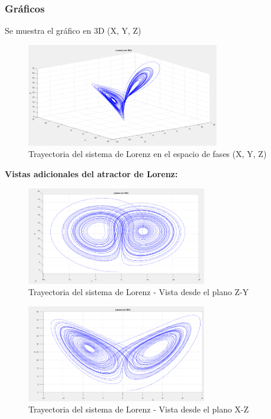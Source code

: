 \documentclass[a4paper,12pt]{article}
\theoremstyle{mytheor}
\begin{document}
\subsubsection{Gráficos}

Se muestra el gráfico en 3D (X, Y, Z)

\begin{figure}[H]
    \centering
    \includegraphics[width=0.75\textwidth]{g1.png}
    \caption{Trayectoria del sistema de Lorenz en el espacio de fases (X, Y, Z)}
    \label{fig:lorenz_3d}
\end{figure}

\vspace{0.5cm}

\textbf{Vistas adicionales del atractor de Lorenz:}

\begin{figure}[H]
    \centering
    \includegraphics[width=0.7\textwidth]{g2.png}
    \caption{Trayectoria del sistema de Lorenz - Vista desde el plano Z-Y}
    \label{fig:lorenz_zy}
\end{figure}

\begin{figure}[H]
    \centering
    \includegraphics[width=0.7\textwidth]{g3.png}
    \caption{Trayectoria del sistema de Lorenz - Vista desde el plano X-Z}
    \label{fig:lorenz_xz}
\end{figure}
\end{document}
